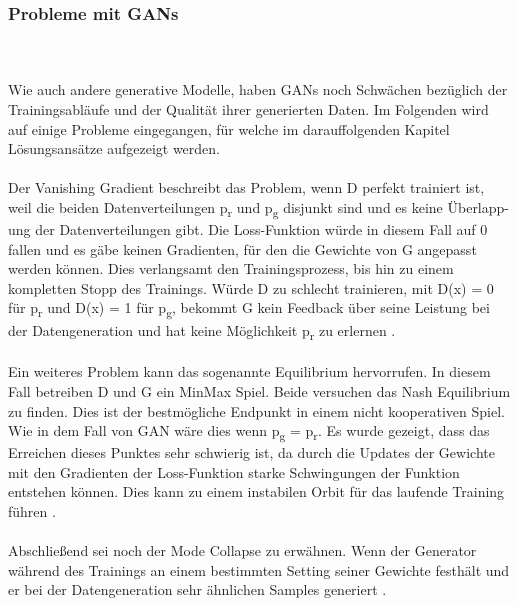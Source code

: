 \documentclass{llncs}
\begin{document}
\subsubsection{Probleme mit GANs}\label{sec:problemegan}
~\\\\
Wie auch andere generative Modelle, haben GANs noch Schwächen bezüglich der Trainingsabläufe und der Qualität ihrer generierten Daten. Im Folgenden wird auf einige Probleme eingegangen, für welche im darauffolgenden Kapitel Lösungsansätze aufgezeigt werden. 
~\\\\
Der Vanishing Gradient beschreibt das Problem, wenn D perfekt trainiert ist, weil die beiden Datenverteilungen p\textsubscript{r} und p\textsubscript{g} disjunkt sind und es keine Überlapp-ung der Datenverteilungen gibt. Die Loss-Funktion würde in diesem Fall auf 0 fallen und es gäbe keinen Gradienten, für den die Gewichte von G angepasst werden können. Dies verlangsamt den Trainingsprozess, bis hin zu einem kompletten Stopp des Trainings. Würde D zu schlecht trainieren, mit D(x) = 0 für p\textsubscript{r} und  D(x) = 1 für p\textsubscript{g}, bekommt G kein Feedback über seine Leistung bei der Datengeneration und hat keine Möglichkeit p\textsubscript{r} zu erlernen \cite{vanishing}.
~\\\\
Ein weiteres Problem kann das sogenannte Equilibrium hervorrufen. In diesem Fall betreiben D und G ein MinMax Spiel. Beide versuchen das Nash Equilibrium zu finden. Dies ist der bestmögliche Endpunkt in einem nicht kooperativen Spiel. Wie in dem Fall von GAN wäre dies wenn  p\textsubscript{g} = p\textsubscript{r}. Es wurde gezeigt, dass das Erreichen dieses Punktes sehr schwierig ist, da durch die Updates der Gewichte mit den Gradienten der Loss-Funktion starke Schwingungen der Funktion entstehen können. Dies kann zu einem instabilen Orbit für das laufende Training führen \cite{improvingan}.   
~\\\\
Abschließend sei noch der Mode Collapse zu erwähnen. Wenn der Generator während des Trainings an einem bestimmten Setting seiner Gewichte festhält und er bei der Datengeneration sehr ähnlichen Samples generiert \cite{improvingan}.
\end{document}
